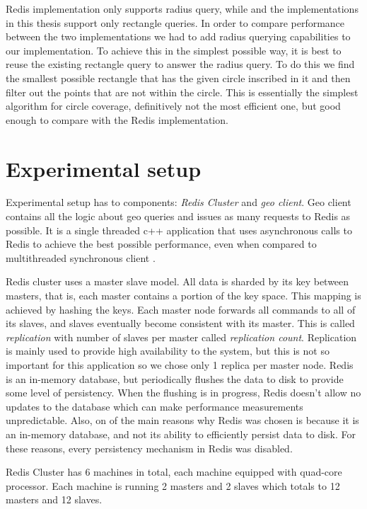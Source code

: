 \documentclass[times, utf8, diplomski]{fer}
\begin{document}
Redis implementation only supports radius query, while and the implementations in this thesis support only rectangle queries. In order to compare performance between the two implementations we had to add radius querying capabilities to our implementation. To achieve this in the simplest possible way, it is best to reuse the existing rectangle query to answer the radius query. To do this we find the smallest possible rectangle that has the given circle inscribed in it and then filter out the points that are not within the circle. This is essentially the simplest algorithm for circle coverage, definitively not the most efficient one, but good enough to compare with the Redis implementation.

\section {Experimental setup} \label{setup}
Experimental setup has to components: \emph{Redis Cluster} and \emph{geo client}. Geo client contains all the logic about geo queries and issues as many requests to Redis as possible. It is a single threaded c++ application that uses asynchronous calls to Redis to achieve the best possible performance, even when compared to multithreaded synchronous client \citet{clientperf}.

Redis cluster uses a master slave model. All data is sharded by its key between masters, that is, each master contains a portion of the key space. This mapping is achieved by hashing the keys. Each master node forwards all commands to all of its slaves, and slaves eventually become consistent with its master. This is called \emph{replication} with number of slaves per master called \emph{replication count}. Replication is mainly used to provide high availability to the system, but this is not so important for this application so we chose only 1 replica per master node.
Redis is an in-memory database, but periodically flushes the data to disk to provide some level of persistency. When the flushing is in progress, Redis doesn't allow no updates to the database which can make performance measurements unpredictable. Also, on of the main reasons why Redis was chosen is because it is an in-memory database, and not its ability to efficiently persist data to disk. For these reasons, every persistency mechanism in Redis was disabled.

Redis Cluster has 6 machines in total, each machine equipped with quad-core processor. Each machine is running 2 masters and 2 slaves which totals to 12 masters and 12 slaves. 
\end{document}
